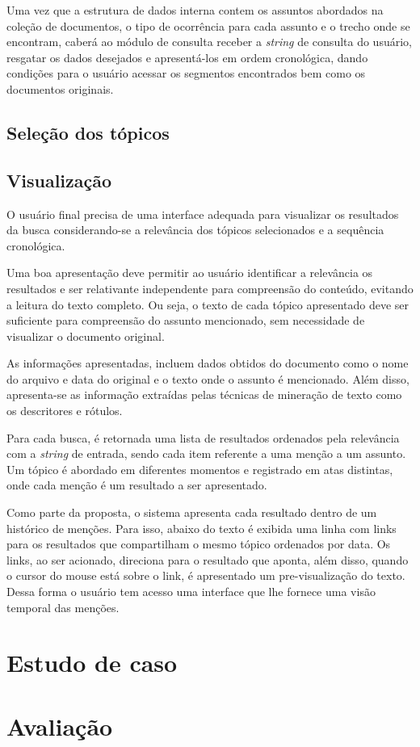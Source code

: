 Uma vez que a estrutura de dados interna contem os assuntos abordados na coleção de documentos, o tipo de ocorrência para cada assunto e o trecho onde se encontram, caberá ao módulo de consulta receber a \textit{string} de consulta do usuário, resgatar os dados desejados e apresentá-los em ordem cronológica, dando condições para o usuário acessar os segmentos encontrados bem como os documentos originais.

\subsection{Seleção dos tópicos}

\subsection{Visualização}

O usuário final precisa de uma interface adequada para visualizar os resultados da busca considerando-se a relevância dos tópicos selecionados e a sequência cronológica.

Uma boa apresentação deve permitir ao usuário identificar a relevância os resultados e ser relativante independente para compreensão do conteúdo, evitando a leitura do texto completo. Ou seja, o texto de cada tópico apresentado deve ser suficiente para compreensão do assunto mencionado, sem necessidade de visualizar o documento original.

As informações apresentadas, incluem dados obtidos do documento como o nome do arquivo e data do original e o texto onde o assunto é mencionado. Além disso, apresenta-se as informação extraídas pelas técnicas de mineração de texto como os descritores e rótulos.


Para cada busca, é retornada uma lista de resultados ordenados pela relevância com a \textit{string} de entrada, sendo cada item referente a uma menção a um assunto. Um tópico é abordado em diferentes momentos e registrado em atas distintas, onde cada menção é um resultado a ser apresentado. 

Como parte da proposta, o sistema apresenta cada resultado dentro de um histórico de menções. Para isso, abaixo do texto é exibida uma linha com links para os resultados que compartilham o mesmo tópico ordenados por data. Os links, ao ser acionado, direciona para o resultado que aponta, além disso, quando o cursor do mouse está sobre o link, é apresentado um pre-visualização do texto. Dessa forma o usuário tem acesso uma interface que lhe fornece uma visão temporal das menções.





\section{Estudo de caso}


\section{Avaliação}

